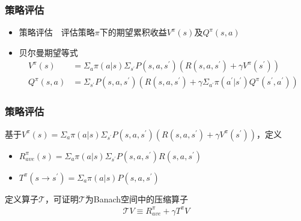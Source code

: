 \documentclass{beamer}
\begin{document}
\begin{CJK*}{GBK}{hei}
\begin{frame}\frametitle{策略评估}
\begin{itemize}
\item 策略评估~~评估策略$\pi$下的期望累积收益$V^{\pi}(s)$及$Q^{\pi}(s, a)$
\item 贝尔曼期望等式
    \begin{align*}
        V^{\pi}(s) &=\Sigma_{a} \pi(a | s) \Sigma_{s^{\prime}} P\left(s, a, s^{\prime}\right)\left(R\left(s, a, s^{\prime}\right)+\gamma V^{\pi}\left(s^{\prime}\right)\right) \\
        Q^{\pi}(s, a) &=\Sigma_{s^{\prime}} P\left(s, a, s^{\prime}\right)\left(R\left(s, a, s^{\prime}\right)+\gamma \Sigma_{a^{\prime}} \pi\left(a^{\prime} | s^{\prime}\right) Q^{\pi}\left(s^{\prime}, a^{\prime}\right)\right)
    \end{align*}
\end{itemize}
\end{frame}

\begin{frame}\frametitle{策略评估}
\begin{theorem}
基于$V^{\pi}(s)=\Sigma_{a} \pi(a \vert s) \Sigma_{s^{\prime}} P\left(s, a, s^{\prime}\right)\left(R\left(s, a, s^{\prime}\right)+\gamma V^{\pi}\left(s^{\prime}\right)\right)$，定义
\begin{itemize}
\item $R^{\pi}_{ave}(s)=\Sigma_{a} \pi(a | s) \Sigma_{s^{\prime}} P\left(s, a, s^{\prime}\right)R\left(s, a, s^{\prime}\right)$
\item $T^{\pi}(s\rightarrow s^{\prime})=\Sigma_{a} \pi(a | s) P\left(s, a, s^{\prime}\right)$
\end{itemize}
定义算子$\mathcal{T}$，可证明$\mathcal{T}$为Banach空间中的压缩算子
    \begin{align*}
        \mathcal{T} V\equiv R^{\pi}_{ave}+\gamma T^{\pi} V
    \end{align*}
\end{theorem}
\end{frame}


\end{CJK*}
\end{document}
